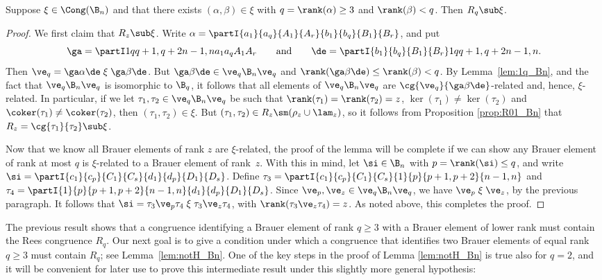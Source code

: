 \begin{lemma}\label{lem:qp_Bn}
Suppose $\xi\in\Cong(\B_n)$ and that there exists $(\alpha,\beta)\in\xi$ with $q=\rank(\alpha)\geq3$ and $\rank(\beta)<q$.  Then $R_q\sub\xi$.
\end{lemma}

\begin{proof} 
We first claim that $R_z\sub\xi$.  Write $\alpha=\partI{a_1}{a_q}{A_1}{A_r}{b_1}{b_q}{B_1}{B_r}$, and put
$$\ga=\partI1q{q+1,q+2}{n-1,n}{a_1}{a_q}{A_1}{A_r} \qquad\text{and}\qquad \de=\partI{b_1}{b_q}{B_1}{B_r}1q{q+1,q+2}{n-1,n}.$$
%
Then $\ve_q=\ga\alpha\de\mathrel\xi\ga\beta\de$.  But $\ga\beta\de\in\ve_q\B_n\ve_q$ and ${\rank(\ga\beta\de)\leq\rank(\beta)<q}$.  By Lemma~\ref{lem:1q_Bn}, and the fact that $\ve_q\B_n\ve_q$ is isomorphic to $\B_q$, it follows that all elements of $\ve_q\B_n\ve_q$ are $\cg{\ve_q}{\ga\beta\de}$-related and, hence, $\xi$-related.  In particular, if we let $\tau_1,\tau_2\in\ve_q\B_n\ve_q$ be such that $\rank(\tau_1)=\rank(\tau_2)=z$, $\ker(\tau_1)\not=\ker(\tau_2)$ and $\coker(\tau_1)\not=\coker(\tau_2)$, then $(\tau_1,\tau_2)\in\xi$.  But $(\tau_1,\tau_2)\in R_z\sm(\rho_z\cup\lam_z)$, so it follows from Proposition \ref{prop:R01_Bn} that $R_z=\cg{\tau_1}{\tau_2}\sub\xi$.

Now that we know all Brauer elements of rank $z$ are $\xi$-related, the proof of the lemma will be complete if we can show any Brauer element of rank at most $q$ is $\xi$-related to a Brauer element of rank~$z$.  With this in mind, let $\si\in\B_n$ with $p=\rank(\si)\leq q$, and write $\si=\partI{c_1}{c_p}{C_1}{C_s}{d_1}{d_p}{D_1}{D_s}$.  Define ${\tau_3=\partI{c_1}{c_p}{C_1}{C_s}{1}{p}{p+1,p+2}{n-1,n}}$ and $\tau_4=\partI{1}{p}{p+1,p+2}{n-1,n}{d_1}{d_p}{D_1}{D_s}$.  Since $\ve_p,\ve_z\in\ve_q\B_n\ve_q$, we have $\ve_p \mathrel\xi \ve_z$, by the previous paragraph.  It follows that $\si = \tau_3\ve_p\tau_4 \mathrel\xi \tau_3\ve_z\tau_4$, with $\rank(\tau_3\ve_z\tau_4)=z$.  As noted above, this completes the proof. \end{proof}

The previous result shows that a congruence identifying a Brauer element of rank $q\geq3$ with a Brauer element of lower rank must contain the Rees congruence $R_q$.
%
Our next goal is to give a condition under which a congruence that identifies two Brauer elements of equal rank $q\geq3$ must contain $R_q$; see Lemma~\ref{lem:notH_Bn}.
%
One of the key steps in the proof of Lemma \ref{lem:notH_Bn} is true also for $q=2$, and it will be convenient for later use to prove this intermediate result under this slightly more general hypothesis:



